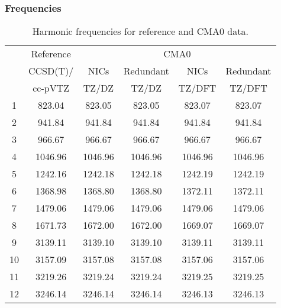 \documentclass[10pt,oneside]{article}
\begin{document}
\begin{table}[h!]
\subsubsection*{Frequencies}
\centering
\caption{Harmonic frequencies for reference and CMA0 data.}
\begin{tabular}{cccccc}
\toprule
{} & Reference & \multicolumn{4}{c}{CMA0} \\
{} &  CCSD(T)/ &    NICs &  Redundant &    NICs & Redundant \\
{} &   cc-pVTZ &   TZ/DZ &      TZ/DZ &  TZ/DFT &    TZ/DFT \\
\midrule
1  &    823.04 &  823.05 &     823.05 &  823.07 &    823.07 \\
2  &    941.84 &  941.84 &     941.84 &  941.84 &    941.84 \\
3  &    966.67 &  966.67 &     966.67 &  966.67 &    966.67 \\
4  &   1046.96 & 1046.96 &    1046.96 & 1046.96 &   1046.96 \\
5  &   1242.16 & 1242.18 &    1242.18 & 1242.19 &   1242.19 \\
6  &   1368.98 & 1368.80 &    1368.80 & 1372.11 &   1372.11 \\
7  &   1479.06 & 1479.06 &    1479.06 & 1479.06 &   1479.06 \\
8  &   1671.73 & 1672.00 &    1672.00 & 1669.07 &   1669.07 \\
9  &   3139.11 & 3139.10 &    3139.10 & 3139.11 &   3139.11 \\
10 &   3157.09 & 3157.08 &    3157.08 & 3157.06 &   3157.06 \\
11 &   3219.26 & 3219.24 &    3219.24 & 3219.25 &   3219.25 \\
12 &   3246.14 & 3246.14 &    3246.14 & 3246.13 &   3246.13 \\
\bottomrule
\end{tabular}
\end{table}
\end{document}
